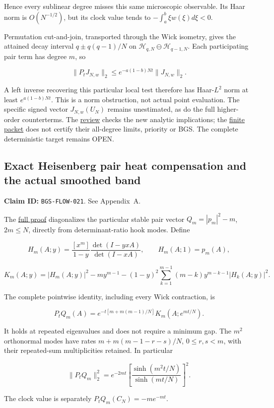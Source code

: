 Hence every sublinear degree misses this same microscopic observable.
Its Haar norm is \(O(N^{-1/2})\), but its clock value tends to
\(-\int_a^b\xi w(\xi)d\xi<0\).

Permutation cut-and-join, transported through the Wick isometry, gives
the attained decay interval \(q\pm q(q-1)/N\) on
\(\mathcal H_{q,N}\ominus\mathcal H_{q-1,N}\). Each participating
pair term has degree \(m\), so

\[
\|P_tJ_{N,w}\|_2\le e^{-a(1-b)Nt}\|J_{N,w}\|_2.
\]

A left inverse recovering this particular local test therefore has
Haar-\(L^2\) norm at least \(e^{a(1-b)Nt}\). This is a norm obstruction,
not actual point evaluation. The specific signed vector
\(J_{N,w}(U_N)\) remains unestimated, as do the full higher-order
counterterms. The \href{https://github.com/ChurilovMaksim/BGS/blob/main/archive/record/growing_degree_review_20261005.md}{review}
checks the new analytic implications; the
\href{https://github.com/ChurilovMaksim/BGS/blob/main/archive/evidence/executions/20261005/degree-growth/manifest.json}{finite packet}
does not certify their all-degree limits, priority or BGS.
The complete deterministic target remains OPEN.

\hypertarget{exact-heisenberg-pair-heat-compensation-and-the-actual-smoothed-band}{%
\subsection{Exact Heisenberg pair heat compensation and the actual smoothed band}\label{exact-heisenberg-pair-heat-compensation-and-the-actual-smoothed-band}}

\textbf{Claim ID:} \texttt{BGS-FLOW-021}. See Appendix~A.

\begin{theorem}\label{pass2:frontier-flow-021}

The
\href{https://github.com/ChurilovMaksim/BGS/blob/main/mathematics/heisenberg_pair_heat_formula.md}{full proof} diagonalizes the particular
stable pair vector \(Q_m=|p_m|^2-m\), \(2m\le N\), directly from
determinant-ratio hook modes. Define

\[
H_m(A;y)=\frac{[x^m]}{1-y}
 \frac{\det(I-yxA)}{\det(I-xA)},\qquad H_m(A;1)=p_m(A),
\]

\[
K_m(A;y)=|H_m(A;y)|^2-my^{m-1}
 -(1-y)^2\sum_{k=1}^{m-1}(m-k)y^{m-k-1}|H_k(A;y)|^2.
\]

The complete pointwise identity, including every Wick contraction, is

\[
P_tQ_m(A)=e^{-t[m+m(m-1)/N]}K_m(A;e^{mt/N}).
\]

It holds at repeated eigenvalues and does not require a minimum gap.
The \(m^2\) orthonormal modes have rates
\(m+m(m-1-r-s)/N\), \(0\le r,s<m\), with their repeated-sum
multiplicities retained. In particular

\[
\|P_tQ_m\|_2^2=e^{-2mt}
 \left[\frac{\sinh(m^2t/N)}{\sinh(mt/N)}\right]^2.
\]

The clock value is separately \(P_tQ_m(C_N)=-me^{-mt}\).

\end{theorem}

